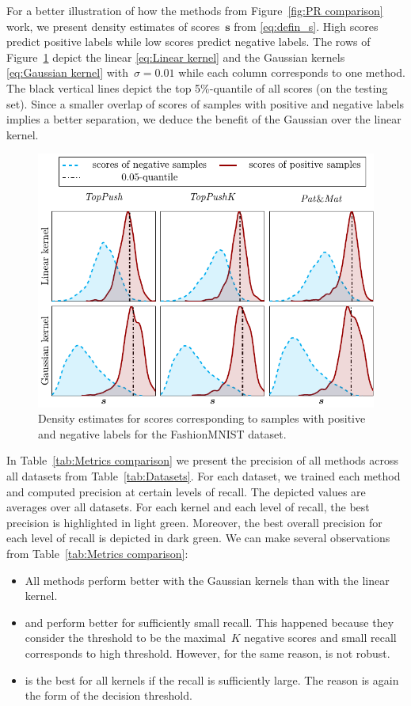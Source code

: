 For a better illustration of how the methods from Figure~\ref{fig:PR comparison} work, we present density estimates of scores~$\bm s$ from \eqref{eq:defin_s}. High scores predict positive labels while low scores predict negative labels. The rows of Figure~\ref{fig:Scores comparison} depict the linear \eqref{eq:Linear kernel} and the Gaussian kernels \eqref{eq:Gaussian kernel} with~$\sigma = 0.01$ while each column corresponds to one method. The black vertical lines depict the top 5\%-quantile of all scores (on the testing set). Since a smaller overlap of scores of samples with positive and negative labels implies a better separation, we deduce the benefit of the Gaussian over the linear kernel.

\begin{figure}[!ht]
  \centering
  \includegraphics[width = \linewidth]{images/dual_results2.pdf}
  \caption{Density estimates for scores corresponding to samples with positive and negative labels for the FashionMNIST dataset.}
  \label{fig:Scores comparison}
\end{figure}

In Table~\ref{tab:Metrics comparison} we present the precision of all methods across all datasets from Table~\ref{tab:Datasets}. For each dataset, we trained each method and computed precision at certain levels of recall. The depicted values are averages over all datasets. For each kernel and each level of recall, the best precision is highlighted in light green. Moreover, the best overall precision for each level of recall is depicted in dark green. We can make several observations from Table~\ref{tab:Metrics comparison}:
\begin{itemize}
  \item All methods perform better with the Gaussian kernels than with the linear kernel. 
  \item \TopPush and \TopPushK perform better for sufficiently small recall. This happened because they consider the threshold to be the maximal~$K$ negative scores and small recall corresponds to high threshold. However, for the same reason, \TopPush is not robust.
  \item \PatMat is the best for all kernels if the recall is sufficiently large. The reason is again the form of the decision threshold.
\end{itemize}

